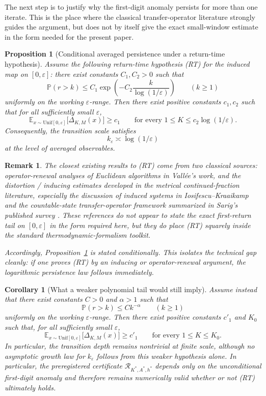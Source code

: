\documentclass[11pt]{article}
\newtheorem{proposition}[definition]{Proposition}
\newtheorem{corollary}[definition]{Corollary}
\newtheorem{remark}[definition]{Remark}
\begin{document}
The next step is to justify why the first-digit anomaly persists for more than one iterate. This is the place where the classical transfer-operator literature strongly guides the argument, but does not by itself give the exact small-window estimate in the form needed for the present paper.

\begin{proposition}[Conditional averaged persistence under a return-time hypothesis]\label{prop:conditionalRT}
Assume the following return-time hypothesis \textnormal{(RT)} for the induced map on $[0,\varepsilon]$: there exist constants $C_1,C_2>0$ such that
\[
\mathbb{P}(r>k) \le C_1 \exp\!\left(-C_2 \frac{k}{\log(1/\varepsilon)}\right)
\qquad (k\ge1)
\]
uniformly on the working $\varepsilon$-range. Then there exist positive constants $c_1,c_2$ such that for all sufficiently small $\varepsilon$,
\[
\mathbb{E}_{x\sim \mathrm{Unif}[0,\varepsilon]}\big[\Delta_{K,M}(x)\big] \ge c_1
\qquad \text{for every } 1\le K\le c_2\log(1/\varepsilon).
\]
Consequently, the transition scale satisfies
\[
k_{\varepsilon} \asymp \log(1/\varepsilon)
\]
at the level of averaged observables.
\end{proposition}

\begin{remark}
The closest existing results to \textnormal{(RT)} come from two classical sources: operator-renewal analyses of Euclidean algorithms in Vall\'ee's work, and the distortion / inducing estimates developed in the metrical continued-fraction literature, especially the discussion of induced systems in Iosifescu--Kraaikamp and the countable-state transfer-operator framework summarized in Sarig's published survey \cite{Vallee1998,Iosifescu2002,Sarig2015}. These references do not appear to state the exact first-return tail on $[0,\varepsilon]$ in the form required here, but they do place \textnormal{(RT)} squarely inside the standard thermodynamic-formalism toolkit.

Accordingly, Proposition~\ref{prop:conditionalRT} is stated conditionally. This isolates the technical gap cleanly: if one proves \textnormal{(RT)} by an inducing or operator-renewal argument, the logarithmic persistence law follows immediately.
\end{remark}

\begin{corollary}[What a weaker polynomial tail would still imply]
Assume instead that there exist constants $C>0$ and $\alpha>1$ such that
\[
\mathbb{P}(r>k)\le Ck^{-\alpha}
\qquad (k\ge 1)
\]
uniformly on the working $\varepsilon$-range. Then there exist positive constants $c'_1$ and $K_0$ such that, for all sufficiently small $\varepsilon$,
\[
\mathbb{E}_{x\sim \mathrm{Unif}[0,\varepsilon]}\big[\Delta_{K,M}(x)\big] \ge c'_1
\qquad \text{for every } 1\le K\le K_0.
\]
In particular, the transition depth remains nontrivial at finite scale, although no asymptotic growth law for $k_{\varepsilon}$ follows from this weaker hypothesis alone. In particular, the preregistered certificate $\mathcal{R}_{K^*,A^*,h^*}$ depends only on the unconditional first-digit anomaly and therefore remains numerically valid whether or not \textnormal{(RT)} ultimately holds.
\end{corollary}
\end{document}
